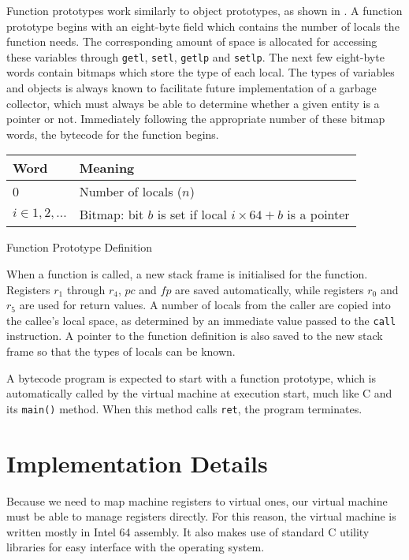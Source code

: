 		Function prototypes work similarly to object prototypes, as shown in . A function prototype begins with an eight-byte field which contains the number of locals the function needs. The corresponding amount of space is allocated for accessing these variables through \texttt{getl}, \texttt{setl}, \texttt{getlp} and \texttt{setlp}. The next few eight-byte words contain bitmaps which store the type of each local. The types of variables and objects is always known to facilitate future implementation of a garbage collector, which must always be able to determine whether a given entity is a pointer or not. Immediately following the appropriate number of these bitmap words, the bytecode for the function begins.
		
		\begin{myfigure}
			\begin{tabular}{|l|l| }
				\hline
				Word & Meaning \\
				\hline
				0 & Number of locals ($n$) \\
				\hline
				$i \in 1, 2, ...$ & Bitmap: bit $b$ is set if local $i\times64 + b$ is a pointer \\
				\hline
			\end{tabular}
			\caption{Function Prototype Definition}
			\label{fig:funcproto}
		\end{myfigure}
		
		When a function is called, a new stack frame is initialised for the function. Registers $r_1$ through $r_4$, $pc$ and $fp$ are saved automatically, while registers $r_0$ and $r_5$ are used for return values. A number of locals from the caller are copied into the callee's local space, as determined by an immediate value passed to the \texttt{call} instruction. A pointer to the function definition is also saved to the new stack frame so that the types of locals can be known.
		
		A bytecode program is expected to start with a function prototype, which is automatically called by the virtual machine at execution start, much like C and its \texttt{main()} method. When this method calls \texttt{ret}, the program terminates.
		
	\section{Implementation Details}
		Because we need to map machine registers to virtual ones, our virtual machine must be able to manage registers directly. For this reason, the virtual machine is written mostly in Intel 64 assembly. It also makes use of standard C utility libraries for easy interface with the operating system.
		
